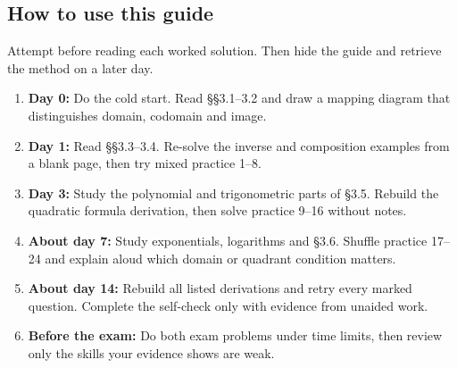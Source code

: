 \documentclass[11pt]{article}
\begin{document}
\begin{keepsection}
\section{How to use this guide}

Attempt before reading each worked solution. Then hide the guide and retrieve the method on a later day.

\begin{enumerate}
\item \textbf{Day 0:} Do the cold start. Read §§3.1–3.2 and draw a mapping diagram that distinguishes domain, codomain and image.
\item \textbf{Day 1:} Read §§3.3–3.4. Re-solve the inverse and composition examples from a blank page, then try mixed practice 1–8.
\item \textbf{Day 3:} Study the polynomial and trigonometric parts of §3.5. Rebuild the quadratic formula derivation, then solve practice 9–16 without notes.
\item \textbf{About day 7:} Study exponentials, logarithms and §3.6. Shuffle practice 17–24 and explain aloud which domain or quadrant condition matters.
\item \textbf{About day 14:} Rebuild all listed derivations and retry every marked question. Complete the self-check only with evidence from unaided work.
\item \textbf{Before the exam:} Do both exam problems under time limits, then review only the skills your evidence shows are weak.
\end{enumerate}
\end{keepsection}
\end{document}
